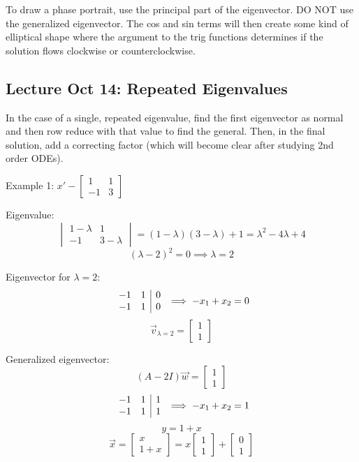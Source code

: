 \documentclass[12pt]{article}
\begin{document}
To draw a phase portrait, use the principal part of the eigenvector. DO NOT use the generalized eigenvector. The cos and sin terms will then create some kind of elliptical shape where the argument to the trig functions determines if the solution flows clockwise or counterclockwise. 

\subsection*{Lecture Oct 14: Repeated Eigenvalues}
In the case of a single, repeated eigenvalue, find the first eigenvector as normal and then row reduce with that value to find the general. Then, in the final solution, add a correcting factor (which will become clear after studying 2nd order ODEs).

Example 1: $x' - \begin{bmatrix}
    1 & 1\\
    -1 & 3
\end{bmatrix}$

Eigenvalue:
\[\begin{vmatrix}
    1 - \lambda & 1\\
    -1 & 3 - \lambda
\end{vmatrix} = (1 - \lambda)(3 - \lambda) + 1 = \lambda^2 -4\lambda + 4\]
\[(\lambda - 2)^2 = 0 \implies \lambda = 2\]

Eigenvector for $\lambda = 2$:
\[\begin{array}{c c | c}
    -1 & 1 & 0\\
    -1 & 1 & 0
\end{array} \implies -x_1 + x_2 = 0\]
\[\vec{v}_{\lambda = 2} = \begin{bmatrix}
    1\\1
\end{bmatrix}\]

Generalized eigenvector:
\[(A - 2I)\vec{w} = \begin{bmatrix}
    1\\1
\end{bmatrix}\]
\[\begin{array}{c c |c}
    -1 & 1 & 1\\
    -1 & 1 & 1
\end{array} \implies -x_1 + x_2 = 1\]
\[y = 1 + x\]
\[\vec{x} = \begin{bmatrix}
    x\\
    1 + x
\end{bmatrix} = x \begin{bmatrix}
    1\\1
\end{bmatrix} + \begin{bmatrix}
    0\\1
\end{bmatrix}\]
\end{document}
